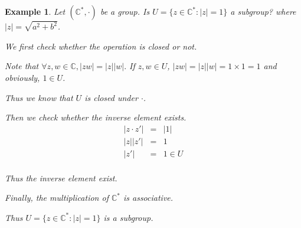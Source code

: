 \documentclass{article}
\theoremstyle{MyNonumberplain}
\theoremstyle{break}
\theoremstyle{break}
\newtheorem{example}{Example}[section]
\theoremstyle{break}
\theoremstyle{definition}
\theoremstyle{break}
\begin{document}
\begin{expbox}
    \begin{example}
                Let $(\mathbb{C}^{\ast}, \cdot)$ be a group. Is $U = \{ z \in
        \mathbb{C}^{\ast} : | z | = 1 \}$ a subgroup? where $| z | = \sqrt{a^2 +
        b^2}$.
        \begin{ansbox}
            We first check whether the operation is closed or not.\bigskip

            Note that $\forall z, w \in \mathbb{C}, | z w | = | z | | w | .$ If $z, w \in
            U$, $| z w | = | z |  | w | = 1 \times 1 = 1$ and obviously, $1 \in U$.\bigskip
    
            Thus we know that $U$ is closed under $\cdot$.\bigskip
    
            Then we check whether the inverse element exists.\bigskip
            \begin{eqnarray*}
            | z \cdot z' | & = & | 1 |\\
            | z |  | z' | & = & 1\\
            | z' | & = & 1 \in U
            \end{eqnarray*}\\
            Thus the inverse element exist.\bigskip
    
            Finally, the multiplication of $\mathbb{C}^{\ast}$ is associative.\bigskip
    
            Thus $U = \{ z \in \mathbb{C}^{\ast} : | z | = 1 \}$ is a subgroup.
    
        \end{ansbox}

    \end{example}
\end{expbox}
\end{document}
